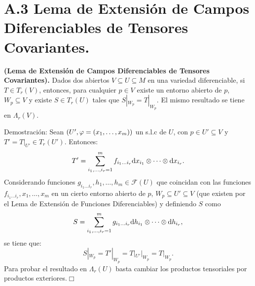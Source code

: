 \documentclass[cursovd_portada.tex]{subfiles}
\begin{document}
\section*{A.3 Lema de Extensión de Campos Diferenciables de Tensores Covariantes.}
\begin{teoap}
{\bf (Lema de Extensión de Campos Diferenciables de Tensores Covariantes).} Dados dos abiertos $V\subseteq
U\subseteq M$ en una variedad diferenciable, si $T\in T_r(V)$, entonces, para cualquier $p\in V$ existe un entorno
abierto de $p$, $W_p\subseteq V$ y existe $S\in T_r(U)$ tales que $S|_{W_p}=T|_{W_p}$. El mismo resultado se tiene
en $\Lambda_r(V)$.
\end{teoap}
{\sc Demostración:} Sean $(U',\varphi=(x_1,\dots ,x_m))$ un s.l.c de $U$, con $p\in U'\subseteq V$ y $T'=T|_{U'}\in
T_r(U')$. Entonces:
$$T'=\sum_{i_1,\dots ,i_r=1}^mf_{i_1\dots i_r}{\rm d} x_{i_1}\otimes\cdots\otimes{\rm d} x_{i_r}.$$
\hs Considerando funciones $g_{i_1\dots i_r},h_1,\dots ,h_m\in\mathcal{F}(U)$ que coincidan con las funciones
$f_{i_1\dots i_r},x_1,\dots ,x_m$ en un cierto entorno abierto de $p$, $W_p\subseteq U'\subseteq V$ (que existen
por el Lema de Extensión de Funciones Diferenciables) y definiendo $S$ como
$$S=\sum_{i_1,\dots ,i_r=1}^mg_{i_1\dots i_r}{\rm d} h_{i_1}\otimes\cdots\otimes{\rm d} h_{i_r},$$
se tiene que:
$$S|_{W_p}=T'|_{W_p}=T|_{U'}|_{W_p}=T|_{W_p}.$$
\hs Para probar el resultado en $\Lambda_r(U)$ basta cambiar los productos tensoriales por productos
exteriores.\hfill $\Box$
\end{document}
